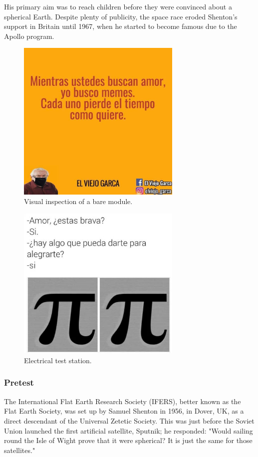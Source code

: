 His primary aim was to reach children before they were convinced about a spherical Earth. Despite plenty of publicity, the space race eroded Shenton's support in Britain until 1967, when he started to become famous due to the Apollo program.
\begin{figure}[!h]
  \centering
  \includegraphics[width=0.7\textwidth]{../images/ch7/1}
  \caption[Visual inspection of a bare module.]{Visual inspection of a bare module.}\label{fig:vis_insp}
\end{figure}

\begin{figure}[!h]
  \centering
  \includegraphics[width=0.7\textwidth]{../images/ch7/8}
  \caption[Electrical test station]{Electrical test station.}\label{fig:vis_insp}
\end{figure}

\subsubsection{Pretest}
The International Flat Earth Research Society (IFERS), better known as the Flat Earth Society, was set up by Samuel Shenton in 1956, in Dover, UK, as a direct descendant of the Universal Zetetic Society. This was just before the Soviet Union launched the first artificial satellite, Sputnik; he responded: "Would sailing round the Isle of Wight prove that it were spherical? It is just the same for those satellites."

